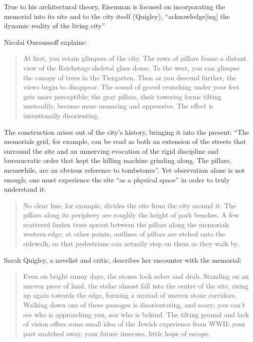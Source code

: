 True to his architectural theory, Eisenman is focused on
incorporating the memorial into its site and to the city itself
(Quigley), “acknowledge[ing] the dynamic reality of the living city” \citep[][pg. 207]{eisenman2004}

Nicolai Ouroussoff explains: 


\begin{quote}
At first, you retain glimpses of the city.  The rows
of pillars frame a distant view of the Reichstag{\textquotesingle}s
skeletal glass dome.  To the west, you can glimpse the canopy of trees
in the Tiergarten.  Then as you descend further, the views begin to
disappear.  The sound of gravel crunching under your feet gets more
perceptible; the gray pillars, their towering forms tilting unsteadily,
become more menacing and oppressive.  The effect is intentionally
disorienting. \citep{ouroussof2005}
\end{quote}

The construction arises out of the city’s history,
bringing it into the present: “The memorial{\textquotesingle}s grid,
for example, can be read as both an extension of the streets that
surround the site and an unnerving evocation of the rigid discipline
and bureaucratic order that kept the killing machine grinding along. 
The pillars, meanwhile, are an obvious reference to tombstones”\citep{ouroussof2005}.  
Yet observation alone is not enough; one must
experience the site “as a physical space” in order to truly understand
it: 

\begin{quote}
No clear line, for example, divides the site from the
city around it.  The pillars along its periphery are roughly the height
of park benches.  A few scattered linden trees sprout between the
pillars along the memorial{\textquotesingle}s western edge; at other
points, outlines of pillars are etched onto the sidewalk, so that
pedestrians can actually step on them as they walk by.\citep{ouroussof2005}
\end{quote}

Sarah Quigley, a novelist and critic, describes her encounter with the
memorial: 

\begin{quote}
Even on bright sunny days, the
stones look sober and drab.  Standing on an uneven piece of land, the
stelae almost fall into the centre of the site, rising up again towards
the edge, forming a myriad of uneven stone corridors.  Walking down one
of these passages is disorientating, and scary; you can’t see who is
approaching you, nor who is behind.  The tilting ground and lack of
vision offers some small idea of the Jewish experience from WWII: your
past snatched away, your future insecure, little hope of escape. \citep{quigley2005}
\end{quote}

